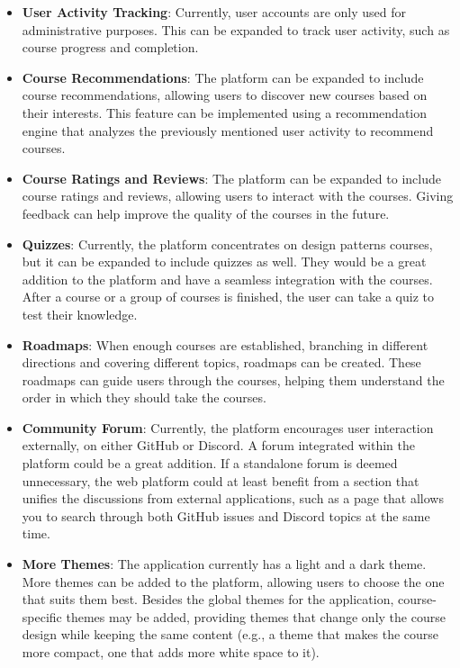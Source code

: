 \begin{itemize}
\item \textbf{User Activity Tracking}: Currently, user accounts are only used for administrative purposes. This can be expanded to track user activity, such as course progress and completion.

\item \textbf{Course Recommendations}: The platform can be expanded to include course recommendations, allowing users to discover new courses based on their interests. This feature can be implemented using a recommendation engine that analyzes the previously mentioned user activity to recommend courses.

\item \textbf{Course Ratings and Reviews}: The platform can be expanded to include course ratings and reviews, allowing users to interact with the courses. Giving feedback can help improve the quality of the courses in the future.

\item \textbf{Quizzes}: Currently, the platform concentrates on design patterns courses, but it can be expanded to include quizzes as well. They would be a great addition to the platform and have a seamless integration with the courses. After a course or a group of courses is finished, the user can take a quiz to test their knowledge.

\item \textbf{Roadmaps}: When enough courses are established, branching in different directions and covering different topics, roadmaps can be created. These roadmaps can guide users through the courses, helping them understand the order in which they should take the courses.

\item \textbf{Community Forum}: Currently, the platform encourages user interaction externally, on either GitHub or Discord. A forum integrated within the platform could be a great addition. If a standalone forum is deemed unnecessary, the web platform could at least benefit from a section that unifies the discussions from external applications, such as a page that allows you to search through both GitHub issues and Discord topics at the same time.

\item \textbf{More Themes}: The application currently has a light and a dark theme. More themes can be added to the platform, allowing users to choose the one that suits them best. Besides the global themes for the application, course-specific themes may be added, providing themes that change only the course design while keeping the same content (e.g., a theme that makes the course more compact, one that adds more white space to it).


\end{itemize}
